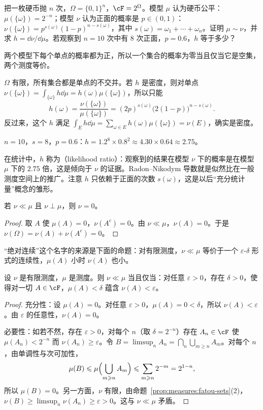 \begin{workedexample}\label{we:ac:likelihood}
把一枚硬币抛 $n$ 次，$\Omega=\{0,1\}^n$，$\cF=2^\Omega$。模型 $\mu$ 认为硬币公平：$\mu(\{\omega\})=2^{-n}$；模型 $\nu$ 认为正面的概率是 $p\in(0,1)$：$\nu(\{\omega\})=p^{s(\omega)}(1-p)^{n-s(\omega)}$，其中 $s(\omega)=\omega_1+\cdots+\omega_n$。证明 $\mu\sim\nu$，并求 $h=\dd\nu/\dd\mu$。若观察到 $n=10$ 次中有 $8$ 次正面，$p=0.6$，$h$ 等于多少？
\end{workedexample}
\begin{solution}
两个模型下每个单点的概率都为正，所以一个集合的概率为零当且仅当它是空集，两个测度等价。

$\Omega$ 有限，所有集合都是单点的不交并。若 $h$ 是密度，则对单点 $\nu(\{\omega\})=\int_{\{\omega\}}h\dd\mu=h(\omega)\mu(\{\omega\})$，所以只能
\[
h(\omega)=\frac{\nu(\{\omega\})}{\mu(\{\omega\})}=(2p)^{s(\omega)}\bigl(2(1-p)\bigr)^{n-s(\omega)} .
\]
反过来，这个 $h$ 满足 $\int_Eh\dd\mu=\sum_{\omega\in E}h(\omega)\mu(\{\omega\})=\nu(E)$，确实是密度。

$n=10$，$s=8$，$p=0.6$：$h=1.2^8\times0.8^2\approx4.30\times0.64\approx2.75$。

在统计中，$h$ 称为（likelihood ratio）：观察到的结果在模型 $\nu$ 下的概率是在模型 $\mu$ 下的 $2.75$ 倍，这是倾向于 $\nu$ 的证据。Radon--Nikodym 导数就是似然比在一般测度空间上的推广。注意 $h$ 只依赖于正面的次数 $s(\omega)$，这是以后“充分统计量”概念的雏形。
\end{solution}

\begin{proposition}\label{prop:ac:ac-and-singular}
若 $\nu\ll\mu$ 且 $\nu\perp\mu$，则 $\nu=0$。
\end{proposition}
\begin{proof}
取 $A$ 使 $\mu(A)=0$，$\nu(A^c)=0$。由 $\nu\ll\mu$，$\nu(A)=0$。于是 $\nu(\Omega)=\nu(A)+\nu(A^c)=0$。
\end{proof}

“绝对连续”这个名字的来源是下面的命题：对有限测度，$\nu\ll\mu$ 等价于一个 $\varepsilon$-$\delta$ 形式的连续性，$\mu(A)$ 小时 $\nu(A)$ 也小。

\begin{proposition}\label{prop:ac:epsilon-delta}
设 $\nu$ 是有限测度，$\mu$ 是测度。则 $\nu\ll\mu$ 当且仅当：对任意 $\varepsilon>0$，存在 $\delta>0$，使得对一切 $A\in\cF$，$\mu(A)<\delta$ 蕴含 $\nu(A)<\varepsilon$。
\end{proposition}
\begin{proof}
充分性：设 $\mu(A)=0$。对任意 $\varepsilon>0$，$\mu(A)=0<\delta$，所以 $\nu(A)<\varepsilon$。由 $\varepsilon$ 的任意性，$\nu(A)=0$。

必要性：如若不然，存在 $\varepsilon>0$，对每个 $n$（取 $\delta=2^{-n}$）存在 $A_n\in\cF$ 使 $\mu(A_n)<2^{-n}$ 而 $\nu(A_n)\geqslant\varepsilon$。令 $B=\limsup_nA_n=\bigcap_n\bigcup_{m\geqslant n}A_m$。对每个 $n$，由单调性与次可加性，
\[
\mu(B)\leqslant\mu\Bigl(\bigcup_{m\geqslant n}A_m\Bigr)\leqslant\sum_{m\geqslant n}2^{-m}=2^{1-n},
\]
所以 $\mu(B)=0$。另一方面，$\nu$ 有限，由命题~\ref{prop:measures:fatou-sets}(2)，$\nu(B)\geqslant\limsup_n\nu(A_n)\geqslant\varepsilon>0$。这与 $\nu\ll\mu$ 矛盾。
\end{proof}

